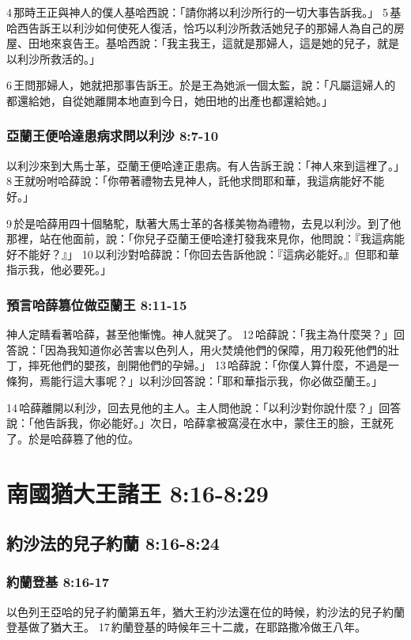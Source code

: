  4 那時王正與神人的僕人基哈西說：「請你將以利沙所行的一切大事告訴我。」 5 基哈西告訴王以利沙如何使死人復活，恰巧以利沙所救活她兒子的那婦人為自己的房屋、田地來哀告王。基哈西說：「我主我王，這就是那婦人，這是她的兒子，就是以利沙所救活的。」 

6 王問那婦人，她就把那事告訴王。於是王為她派一個太監，說：「凡屬這婦人的都還給她，自從她離開本地直到今日，她田地的出產也都還給她。」

\subsubsection{亞蘭王便哈達患病求問以利沙 8:7-10}
以利沙來到大馬士革，亞蘭王便哈達正患病。有人告訴王說：「神人來到這裡了。」 8 王就吩咐哈薛說：「你帶著禮物去見神人，託他求問耶和華，我這病能好不能好。」 

9 於是哈薛用四十個駱駝，馱著大馬士革的各樣美物為禮物，去見以利沙。到了他那裡，站在他面前，說：「你兒子亞蘭王便哈達打發我來見你，他問說：『我這病能好不能好？』」 10 以利沙對哈薛說：「你回去告訴他說：『這病必能好。』但耶和華指示我，他必要死。」

\subsubsection{預言哈薛篡位做亞蘭王 8:11-15}
神人定睛看著哈薛，甚至他慚愧。神人就哭了。 12 哈薛說：「我主為什麼哭？」回答說：「因為我知道你必苦害以色列人，用火焚燒他們的保障，用刀殺死他們的壯丁，摔死他們的嬰孩，剖開他們的孕婦。」 13 哈薛說：「你僕人算什麼，不過是一條狗，焉能行這大事呢？」以利沙回答說：「耶和華指示我，你必做亞蘭王。」 

14 哈薛離開以利沙，回去見他的主人。主人問他說：「以利沙對你說什麼？」回答說：「他告訴我，你必能好。」次日，哈薛拿被窩浸在水中，蒙住王的臉，王就死了。於是哈薛篡了他的位。


\section{南國猶大王諸王 8:16-8:29 }
\subsection{約沙法的兒子約蘭 8:16-8:24 }
\subsubsection{約蘭登基 8:16-17}
以色列王亞哈的兒子約蘭第五年，猶大王約沙法還在位的時候，約沙法的兒子約蘭登基做了猶大王。 17 約蘭登基的時候年三十二歲，在耶路撒冷做王八年。

